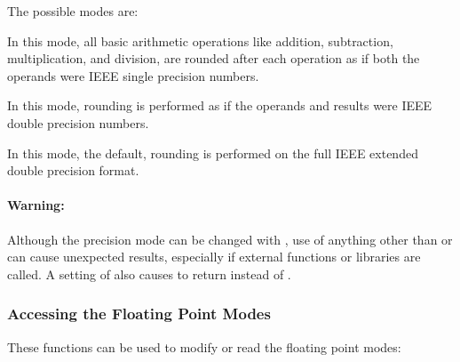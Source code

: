 The possible modes are:
\begin{Lentry}
  
\item[\kwd{24-bit}] In this mode, all basic arithmetic operations like
  addition, subtraction, multiplication, and division, are rounded
  after each operation as if both the operands were IEEE single
  precision numbers.  
  
\item[\kwd{53-bit}] In this mode, rounding is performed as if the
  operands and results were IEEE double precision numbers.
  
\item[\kwd{64-bit}] In this mode, the default, rounding is performed
  on the full IEEE extended double precision format.
  
\end{Lentry}

\paragraph{Warning:}

Although the precision mode can be changed with
, use of anything other than
 or  can cause unexpected results, especially
if external functions or libraries are called.  A setting of
 also causes 
to return \true{} instead of \false.


\subsubsection{Accessing the Floating Point Modes}

These functions can be used to modify or read the floating point modes:

